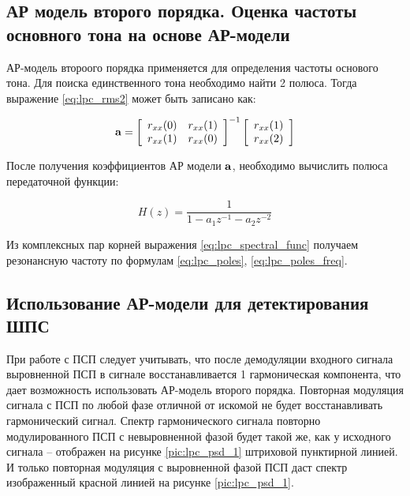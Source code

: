 \subsection{АР модель второго порядка. Оценка частоты основного тона на основе АР-модели}
АР-модель второого порядка применяется для определения частоты основого тона. Для поиска единственного
тона необходимо найти 2 полюса. Тогда выражение \ref{eq:lpc_rms2} может быть записано как:

\begin{center}
\begin{equation}
	\label{eq:lpc_gps_1}
	{\bf a} = 
		\left[ \begin{array}{cc}
			r_{xx}(0) & r_{xx}(1) \\
			r_{xx}(1) & r_{xx}(0)
		\end{array} \right]^{-1}
		\left[ \begin{array}{c}
			r_{xx}(1) \\
			r_{xx}(2)
		\end{array} \right]
\end{equation}
\end{center}

После получения коэффициентов АР модели ${\bf{a}}$, необходимо вычислить полюса передаточной функции:
\begin{center}
\begin{equation}
	\label{eq:lpc_spectral_func}
	H(z) = \frac{1}{1 - a_1 z^{-1} - a_2 z^{-2}}
\end{equation}
\end{center}

Из комплексных пар корней выражения \ref{eq:lpc_spectral_func} получаем резонансную частоту по
формулам \ref{eq:lpc_poles}, \ref{eq:lpc_poles_freq}.

\subsection{Использование АР-модели для детектирования ШПС}

При работе с ПСП следует учитывать, что после демодуляции входного сигнала выровненной ПСП в сигнале восстанавливается 1 гармоническая
компонента, что дает возможность использовать АР-модель второго порядка.
Повторная модуляция сигнала с ПСП по любой фазе отличной от искомой не будет восстанавливать гармонический сигнал.
Спектр гармонического сигнала повторно модулированного ПСП с невыровненной фазой будет такой же, как у исходного сигнала – отображен
на рисунке \ref{pic:lpc_psd_1} штриховой пунктирной линией. И только повторная модуляция с выровненной фазой ПСП даст спектр
изображенный красной линией на рисунке \ref{pic:lpc_psd_1}.

